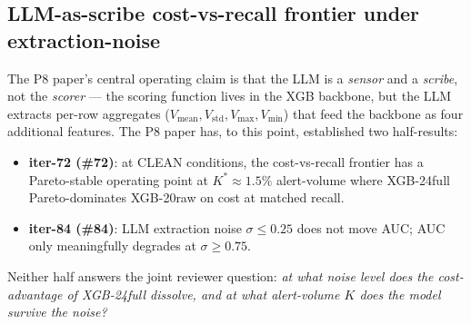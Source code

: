 \subsection{LLM-as-scribe cost-vs-recall frontier under extraction-noise}
\label{sec:p8-noise-cost-frontier}

The P8 paper's central operating claim is that the LLM is a \emph{sensor}
and a \emph{scribe}, not the \emph{scorer} --- the scoring function lives in
the XGB backbone, but the LLM extracts per-row aggregates
($V_{\text{mean}}, V_{\text{std}}, V_{\max}, V_{\min}$) that feed the
backbone as four additional features. The P8 paper has, to this point,
established two half-results:
\begin{itemize}
\item \textbf{iter-72 (\#72)}: at CLEAN conditions, the
      cost-vs-recall frontier has a Pareto-stable operating point at
      $K^* \approx 1.5\%$ alert-volume where XGB-24full Pareto-dominates
      XGB-20raw on cost at matched recall.
\item \textbf{iter-84 (\#84)}: LLM extraction noise $\sigma \le 0.25$
      does not move AUC; AUC only meaningfully degrades at $\sigma \ge 0.75$.
\end{itemize}
Neither half answers the joint reviewer question: \emph{at what noise
level does the cost-advantage of XGB-24full dissolve, and at what
alert-volume $K$ does the model survive the noise?}

